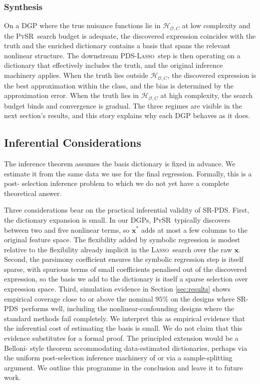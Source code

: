 \documentclass[11pt, a4paper]{article}
\theoremstyle{plain}
\theoremstyle{definition}
\theoremstyle{remark}
\newcommand{\lasso}{\textsc{Lasso}}
\newcommand{\pds}{\textsc{PDS}}
\newcommand{\pysr}{\textsc{PySR}}
\newcommand{\epds}{\textsc{SR-PDS}}
\newcommand{\Xstar}{\bm{x}^{*}}
\newcommand{\Hcal}{\mathcal{H}_{\mathcal{O}, C}}
\begin{document}
\subsubsection{Synthesis}

On a DGP where the
true nuisance functions lie in $\Hcal$ at low complexity and
the \pysr\ search budget is adequate, the discovered
expression coincides with the truth and the enriched
dictionary contains a basis that spans the relevant nonlinear
structure. The downstream \pds-\lasso\ step is then operating
on a dictionary that effectively includes the truth, and the
original \citet{bch2014} inference machinery applies. When the
truth lies outside $\Hcal$, the discovered expression is the
best approximation within the class, and the bias is
determined by the approximation error. When the truth lies in
$\Hcal$ at high complexity, the search budget binds and
convergence is gradual. The three regimes are visible in the
next section's results, and this story explains why each DGP
behaves as it does.

\subsection{Inferential Considerations}
\label{sec:inference}

The \citet{bch2014} inference theorem assumes the basis
dictionary is fixed in advance. We estimate it from the same
data we use for the final regression. Formally, this is a post-%
selection inference problem to which we do not yet have a
complete theoretical answer.

Three considerations bear on the practical inferential validity
of \epds. First, the dictionary expansion is small. In our DGPs,
\pysr\ typically discovers between two and five nonlinear terms,
so $\Xstar$ adds at most a few columns to the original feature
space. The flexibility added by symbolic regression is modest
relative to the flexibility already implicit in the \lasso\
search over the raw $\bm{x}$. Second, the parsimony coefficient
ensures the symbolic regression step is itself sparse, with
spurious terms of small coefficients penalised out of the
discovered expression, so the basis we add to the dictionary is
itself a sparse selection over expression space. Third, simulation
evidence in Section \ref{sec:results} shows empirical coverage
close to or above the nominal $95\%$ on the designs where \epds\
performs well, including the nonlinear-confounding designs where
the standard methods fail completely. We interpret this as
empirical evidence that the inferential cost of estimating the
basis is small. We do not claim that this evidence substitutes
for a formal proof. The principled extension would be a Belloni-%
style theorem accommodating data-estimated dictionaries, perhaps
via the uniform post-selection inference machinery of
\citet{tibshirani2018uniform} or via a sample-splitting argument.
We outline this programme in the conclusion and leave it to
future work.
\end{document}

